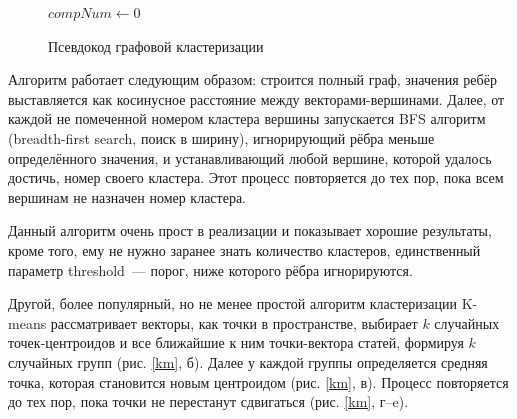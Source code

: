 \documentclass[a4paper, 14pt]{extarticle}
\begin{document}
\begin{figure}[h]
	\begin{algorithm}[H]
		\DontPrintSemicolon
		$ compNum \gets 0 $\;
	\end{algorithm}
	\caption{Псевдокод графовой кластеризации}
	\label{pseudo}
\end{figure}

Алгоритм работает следующим образом: строится полный граф, значения ребёр выставляется как косинусное расстояние между векторами-вершинами. Далее, от каждой не помеченной номером кластера вершины запускается BFS алгоритм (breadth-first search, поиск в ширину), игнорирующий рёбра меньше определённого значения, и устанавливающий любой вершине, которой удалось достичь, номер своего кластера. Этот процесс повторяется до тех пор, пока всем вершинам не назначен номер кластера.

Данный алгоритм очень прост в реализации и показывает хорошие результаты, кроме того, ему не нужно заранее знать количество кластеров, единственный параметр threshold~--- порог, ниже которого рёбра игнорируются.


Другой, более популярный, но не менее простой алгоритм кластеризации K-means рассматривает векторы, как точки в пространстве, выбирает $k$ случайных точек-центроидов и все ближайшие к ним точки-вектора статей, формируя $k$ случайных групп  (рис. \ref{km}, б). Далее у каждой группы определяется средняя точка, которая становится новым центроидом (рис. \ref{km}, в). Процесс повторяется до тех пор, пока точки не перестанут сдвигаться (рис. \ref{km}, г--e).
\end{document}
